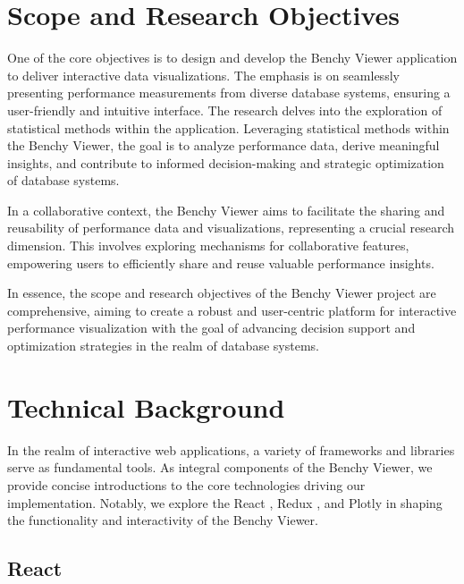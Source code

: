 \section{Scope and Research Objectives}

One of the core objectives is to design and develop the Benchy Viewer application to deliver interactive data visualizations. The emphasis is on seamlessly presenting performance measurements from diverse database systems, ensuring a user-friendly and intuitive interface. The research delves into the exploration of statistical methods within the application. Leveraging statistical methods within the Benchy Viewer, the goal is to analyze performance data, derive meaningful insights, and contribute to informed decision-making and strategic optimization of database systems.

In a collaborative context, the Benchy Viewer aims to facilitate the sharing and reusability of performance data and visualizations, representing a crucial research dimension. This involves exploring mechanisms for collaborative features, empowering users to efficiently share and reuse valuable performance insights.

In essence, the scope and research objectives of the Benchy Viewer project are comprehensive, aiming to create a robust and user-centric platform for interactive performance visualization with the goal of advancing decision support and optimization strategies in the realm of database systems.


\section{Technical Background}

In the realm of interactive web applications, a variety of frameworks and libraries serve as fundamental tools. As integral components of the Benchy Viewer, we provide concise introductions to the core technologies driving our implementation. Notably, we explore the React  \parencite*{react}, Redux  \parencite*{Redux}, and Plotly \parencite{plotly} in shaping the functionality and interactivity of the Benchy Viewer.

\subsection{React}

